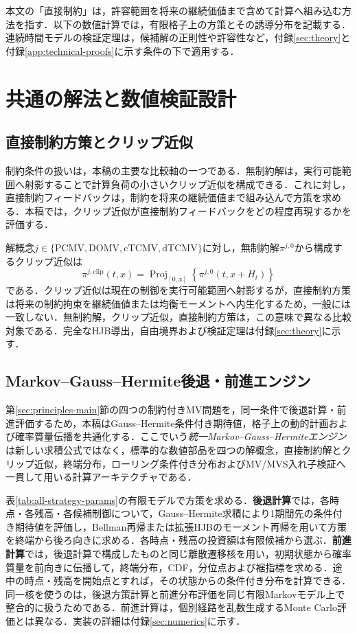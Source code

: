 \documentclass[10pt,a4paper]{article}
\theoremstyle{plain}
\theoremstyle{definition}
\DeclareMathOperator{\Proj}{Proj}
\begin{document}
本文の「直接制約」は，許容範囲を将来の継続価値まで含めて計算へ組み込む方法を指す．以下の数値計算では，有限格子上の方策とその誘導分布を記載する．連続時間モデルの検証定理は，候補解の正則性や許容性など，付録\ref{sec:theory}と付録\ref{app:technical-proofs}に示す条件の下で適用する．
\section{共通の解法と数値検証設計}\label{sec:method-main}
\subsection{直接制約方策とクリップ近似}\label{sec:method-constraints}
制約条件の扱いは，本稿の主要な比較軸の一つである．無制約解は，実行可能範囲へ射影することで計算負荷の小さいクリップ近似を構成できる．これに対し，直接制約フィードバックは，制約を将来の継続価値まで組み込んで方策を求める．本稿では，クリップ近似が直接制約フィードバックをどの程度再現するかを評価する．

解概念$j\in\{\mathrm{PCMV},\mathrm{DOMV},\mathrm{cTCMV},\mathrm{dTCMV}\}$に対し，無制約解$\pi^{j,0}$から構成するクリップ近似は
\[
\pi^{j,\mathrm{clip}}(t,x)=\Proj_{[0,x]}\!\left\{\pi^{j,0}(t,x+H_t)\right\}
\]
である．クリップ近似は現在の制御を実行可能範囲へ射影するが，直接制約方策は将来の制約拘束を継続価値または均衡モーメントへ内生化するため，一般には一致しない．無制約解，クリップ近似，直接制約方策は，この意味で異なる比較対象である．完全なHJB導出，自由境界および検証定理は付録\ref{sec:theory}に示す．

\subsection{Markov--Gauss--Hermite後退・前進エンジン}\label{sec:method-engine}
第\ref{sec:principles-main}節の四つの制約付きMV問題を，同一条件で後退計算・前進評価するため，本稿はGauss--Hermite条件付き期待値，格子上の動的計画および確率質量伝播を共通化する．ここでいう\emph{統一Markov--Gauss--Hermiteエンジン}は新しい求積公式ではなく，標準的な数値部品を四つの解概念，直接制約解とクリップ近似，終端分布，ローリング条件付き分布およびMV/MVS入れ子検証へ一貫して用いる計算アーキテクチャである．

表\ref{tab:all-strategy-params}の有限モデルで方策を求める．\textbf{後退計算}では，各時点・各残高・各候補制御について，Gauss--Hermite求積により1期間先の条件付き期待値を評価し，Bellman再帰または拡張HJBのモーメント再帰を用いて方策を終端から後ろ向きに求める．各時点・残高の投資額は有限候補から選ぶ．\textbf{前進計算}では，後退計算で構成したものと同じ離散遷移核を用い，初期状態から確率質量を前向きに伝播して，終端分布，CDF，分位点および裾指標を求める．途中の時点・残高を開始点とすれば，その状態からの条件付き分布を計算できる．同一核を使うのは，後退方策計算と前進分布評価を同じ有限Markovモデル上で整合的に扱うためである．前進計算は，個別経路を乱数生成するMonte Carlo評価とは異なる．実装の詳細は付録\ref{sec:numerics}に示す．
\end{document}
